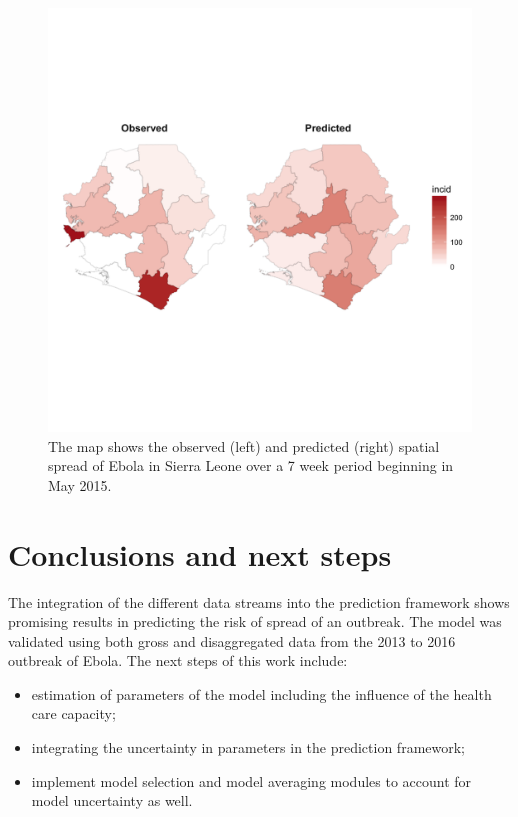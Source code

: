 \documentclass[11pt,]{article}
\begin{document}
\begin{figure}
  \centering
  \includegraphics{ms6-figures/sl-map}
  \caption[Spatial spread of Ebola in Sierra Leone]{The map shows the
    observed (left) and predicted (right) spatial spread of Ebola in
    Sierra Leone over a 7 week period beginning in May 2015.}
  \label{fig:sl-map}
\end{figure}
\FloatBarrier

\section{Conclusions and next steps}\label{sec:conclusions}

The integration of the different data streams into the prediction
framework shows promising results in predicting the risk of spread of
an outbreak. The model was validated using both gross and
disaggregated data from the  2013 to 2016 outbreak of Ebola. The next
steps of this work include:

\begin{itemize}
\item estimation of parameters of the model including the influence of
  the health care capacity;
\item integrating the uncertainty in parameters in the prediction
  framework;
\item implement model selection and model averaging modules to account
  for model uncertainty as well.
\end{itemize}





\newpage


\end{document}

